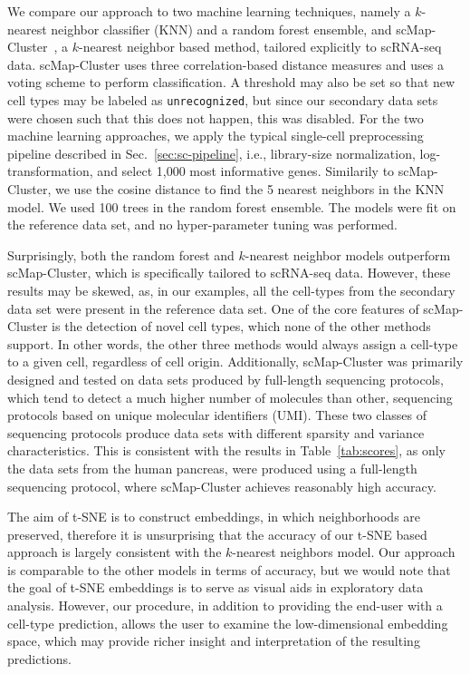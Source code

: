 \documentclass[runningheads]{llncs}
\begin{document}
We compare our approach to two machine learning techniques, namely a $k$-nearest neighbor classifier (KNN) and a random forest ensemble, and scMap-Cluster~\cite{Kiselev2018}, a $k$-nearest neighbor based method, tailored explicitly to scRNA-seq data. scMap-Cluster uses three correlation-based distance measures and uses a voting scheme to perform classification. A threshold may also be set so that new cell types may be labeled as {\tt unrecognized}, but since our secondary data sets were chosen such that this does not happen, this was disabled. For the two machine learning approaches, we apply the typical single-cell preprocessing pipeline described in Sec.~\ref{sec:sc-pipeline}, i.e., library-size normalization, log-transformation, and select 1,000 most informative genes. Similarily to scMap-Cluster, we use the cosine distance to find the 5 nearest neighbors in the KNN model. We used 100 trees in the random forest ensemble. The models were fit on the reference data set, and no hyper-parameter tuning was performed.

Surprisingly, both the random forest and $k$-nearest neighbor models outperform scMap-Cluster, which is specifically tailored to scRNA-seq data. However, these results may be skewed, as, in our examples, all the cell-types from the secondary data set were present in the reference data set. One of the core features of scMap-Cluster is the detection of novel cell types, which none of the other methods support. In other words, the other three methods would always assign a cell-type to a given cell, regardless of cell origin. Additionally, scMap-Cluster was primarily designed and tested on data sets produced by full-length sequencing protocols, which tend to detect a much higher number of molecules than other, sequencing protocols based on unique molecular identifiers (UMI). These two classes of sequencing protocols produce data sets with different sparsity and variance characteristics. This is consistent with the results in Table~\ref{tab:scores}, as only the data sets from the human pancreas, were produced using a full-length sequencing protocol, where scMap-Cluster achieves reasonably high accuracy.

The aim of t-SNE is to construct embeddings, in which neighborhoods are preserved, therefore it is unsurprising that the accuracy of our t-SNE based approach is largely consistent with the $k$-nearest neighbors model. Our approach is comparable to the other models in terms of accuracy, but we would note that the goal of t-SNE embeddings is to serve as visual aids in exploratory data analysis. However, our procedure, in addition to providing the end-user with a cell-type prediction, allows the user to examine the low-dimensional embedding space, which may provide richer insight and interpretation of the resulting predictions.
\end{document}

